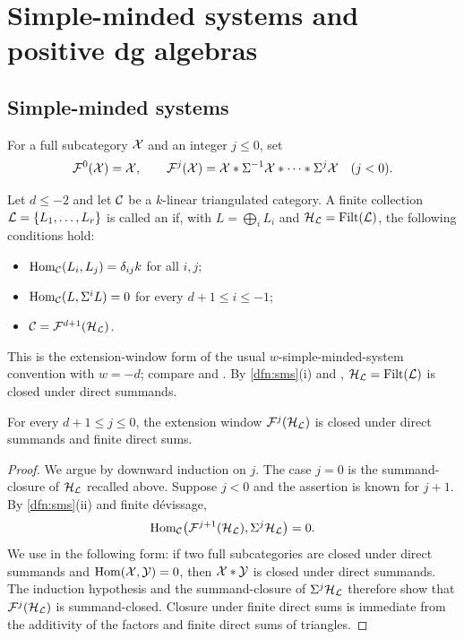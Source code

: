 \documentclass[11pt,a4paper,dvipsnames,x11names]{amsart}
\begin{document}
\section{Simple-minded systems and positive dg algebras}\label{sec:sms-positive}

\subsection{Simple-minded systems}

For a full subcategory $\mathcal X$ and an integer $j\leq0$, set
\[
\mathcal F^0(\mathcal X)=\mathcal X,
\qquad
\mathcal F^j(\mathcal X)=\mathcal X*\Sigma^{-1}\mathcal X*\cdots*\Sigma^j\mathcal X\quad(j<0).
\]

\begin{dfn}\label{dfn:sms}
Let $d\leq-2$ and let $\mathcal C$ be a $k$-linear triangulated category. A finite collection $\mathcal L=\{L_1,\dots,L_r\}$ is called an  if, with $L=\bigoplus_iL_i$ and $\mathcal H_{\mathcal L}=\operatorname{Filt}(\mathcal L)$, the following conditions hold:
\begin{itemize}
	\item [(i)] $\operatorname{Hom}_{\mathcal C}(L_i,L_j)=\delta_{ij}k$ for all $i,j$;
	\item [(ii)] $\operatorname{Hom}_{\mathcal C}(L,\Sigma^iL)=0$ for every $d+1\leq i\leq-1$;
	\item [(iii)] $\mathcal C=\mathcal F^{d+1}(\mathcal H_{\mathcal L})$.
\end{itemize}
\end{dfn}

This is the extension-window form of the usual $w$-simple-minded-system convention with $w=-d$; compare \cite[Definition~5.2]{Jin20} and \cite{Dugas15,CoelhoPauksztello20}. By \cref{dfn:sms}(i) and \cite[Lemma~2.7]{Dugas15}, $\mathcal H_{\mathcal L}=\operatorname{Filt}(\mathcal L)$ is closed under direct summands.


\begin{lem}\label{lem:sms-window-summands}
For every $d+1\leq j\leq0$, the extension window $\mathcal F^j(\mathcal H_{\mathcal L})$ is closed under direct summands and finite direct sums.
\end{lem}
\begin{proof}
We argue by downward induction on $j$. The case $j=0$ is the summand-closure of $\mathcal H_{\mathcal L}$ recalled above. Suppose $j<0$ and the assertion is known for $j+1$. By \cref{dfn:sms}(ii) and finite d\'evissage,
\[
\operatorname{Hom}_\mathcal C\bigl(\mathcal F^{j+1}(\mathcal H_{\mathcal L}),\Sigma^j\mathcal H_{\mathcal L}\bigr)=0.
\]
We use \cite[Proposition~2.1(1)]{IyamaYoshino08} in the following form: if two full subcategories are closed under direct summands and $\operatorname{Hom}(\mathcal X,\mathcal Y)=0$, then $\mathcal X*\mathcal Y$ is closed under direct summands. The induction hypothesis and the summand-closure of $\Sigma^j\mathcal H_{\mathcal L}$ therefore show that $\mathcal F^j(\mathcal H_{\mathcal L})$ is summand-closed. Closure under finite direct sums is immediate from the additivity of the factors and finite direct sums of triangles.
\end{proof}
\end{document}
